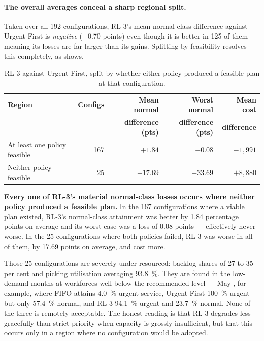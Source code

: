 \paragraph{The overall averages conceal a sharp regional split.} Taken over all 192
configurations, RL-3's mean normal-class difference against Urgent-First is
\emph{negative} (\num{-0.70} points) even though it is better in 125 of them --- meaning its
losses are far larger than its gains. Splitting by feasibility resolves this completely, as
 shows.

\begin{table}[htbp]
\centering
\caption[Matched comparison split by feasibility]{RL-3 against Urgent-First, split by whether
either policy produced a feasible plan at that configuration.}
\label{tab:matched-split}
\small
\begin{tabular}{lrrrr}
\toprule
\textbf{Region} & \textbf{Configs} & \textbf{Mean normal} & \textbf{Worst normal} &
\textbf{Mean cost} \\
 & & \textbf{difference (pts)} & \textbf{difference (pts)} & \textbf{difference} \\
\midrule
At least one policy feasible & 167 & \(+1.84\)  & \(-0.08\)  & \(-1{,}991\) \\
Neither policy feasible      & 25  & \(-17.69\) & \(-33.69\) & \(+8{,}880\) \\
\bottomrule
\end{tabular}
\end{table}

\textbf{Every one of RL-3's material normal-class losses occurs where neither policy produced a
feasible plan.} In the 167 configurations where a viable plan existed, RL-3's normal-class
attainment was better by \num{1.84} percentage points on average and its worst case was a loss
of \num{0.08} points --- effectively never worse. In the 25 configurations where both policies
failed, RL-3 was worse in all of them, by \num{17.69} points on average, and cost 
more.

Those 25 configurations are severely under-resourced: backlog shares of 27 to 35 per cent and
picking utilisation averaging \SI{93.8}{\percent}. They are found in the low-demand months at
workforces well below the recommended level --- May , for example, where FIFO attains
\SI{4.0}{\percent} urgent service, Urgent-First \SI{100}{\percent} urgent but only
\SI{57.4}{\percent} normal, and RL-3 \SI{94.1}{\percent} urgent and \SI{23.7}{\percent} normal.
None of the three is remotely acceptable. The honest reading is that RL-3 degrades less
gracefully than strict priority when capacity is grossly insufficient, but that this occurs only
in a region where no configuration would be adopted.

